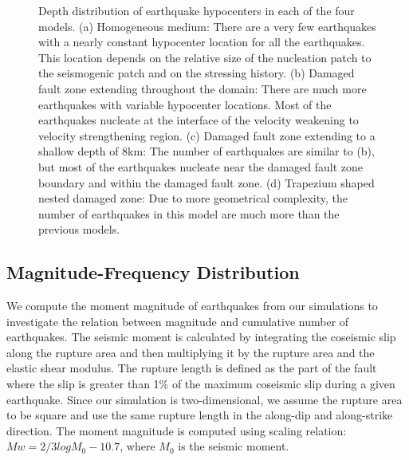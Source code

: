 \documentclass[11pt]{article}
\begin{document}
\begin{figure}[!htb]
{    }
    \caption{Depth distribution of earthquake hypocenters in each of the four models. (a) Homogeneous medium: There are a very few earthquakes with a nearly constant hypocenter location for all the earthquakes. This location depends on the relative size of the nucleation patch to the seismogenic patch and on the stressing history. (b) Damaged fault zone extending throughout the domain: There are much more earthquakes with variable hypocenter locations. Most of the earthquakes nucleate at the interface of the velocity weakening to velocity strengthening region. (c) Damaged fault zone extending to a shallow depth of 8km: The number of earthquakes are similar to (b), but most of the earthquakes nucleate near the damaged fault zone boundary and within the damaged fault zone. (d) Trapezium shaped nested damaged zone: Due to more geometrical complexity, the number of earthquakes in this model are much more than the previous models.}
\end{figure}

\subsection{Magnitude-Frequency Distribution}
We compute the moment magnitude of earthquakes from our simulations to investigate the relation between magnitude and cumulative number of earthquakes. The seismic moment is calculated by integrating the coseismic slip along the rupture area and then multiplying it by the rupture area and the elastic shear modulus. The rupture length is defined as the part of the fault where the slip is greater than 1\% of the maximum coseismic slip during a given earthquake. Since our simulation is two-dimensional, we assume the rupture area to be square and use the same rupture length in the along-dip and along-strike direction. The moment magnitude is computed using \citet{kanamori_1975} scaling relation: $Mw=2/3 logM_0-10.7$, where $M_0$ is the seismic moment.
\end{document}

